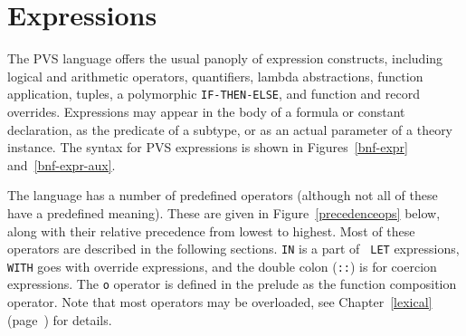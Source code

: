 
\chapter{Expressions}\label{expressions}

The PVS language offers the usual panoply of expression constructs,
including logical and arithmetic operators, quantifiers, lambda
abstractions, function application, tuples, a polymorphic
\texttt{IF-THEN-ELSE}, and function and record overrides.  Expressions may
appear in the body of a formula or constant declaration, as the predicate
of a subtype, or as an actual parameter of a theory instance.  The syntax
for PVS expressions is shown in Figures~\ref{bnf-expr} and~\ref{bnf-expr-aux}.



 The language has a number of predefined operators
(although not all of these have a predefined meaning).  These are given in
Figure~\ref{precedenceops} below, along with their relative precedence
from lowest to highest.  Most of these operators are described in the
following sections.  \texttt{IN} is a part of \texttt{ LET} expressions,
\texttt{WITH} goes with override expressions, and the double colon
(\texttt{::}) is for coercion expressions.  The \texttt{o} operator is
defined in the prelude as the function composition operator.  Note that
most operators may be overloaded, see Chapter~\ref{lexical}
(page~\pageref{lexical}) for details.

